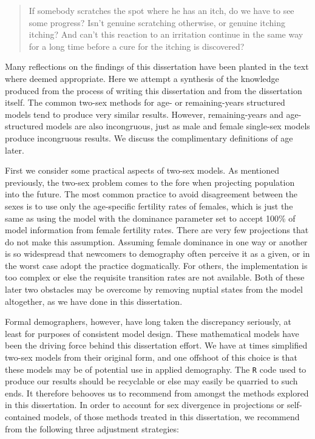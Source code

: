 \FloatBarrier
\label{sec:reflections}


\begin{singlespace}
\begin{quote}
 If somebody scratches the spot where he has an itch, do we have to see 
 some progress? Isn't genuine scratching otherwise, or genuine itching 
itching? And can't this reaction to an irritation continue in the 
same way for a long time before a cure for the itching is discovered?
\citep{wittgenstein1984culture}
\end{quote}
\end{singlespace}

Many reflections on the findings of this dissertation have been planted in the
text where deemed appropriate. Here we attempt a synthesis of the
knowledge produced from the process of writing this dissertation and from the
dissertation itself. The common two-sex methods for age- or remaining-years
structured models tend to produce very similar results. However, remaining-years
and age-structured models are also incongruous, just as male and female
single-sex models produce incongruous results. We discuss the complimentary definitions 
of age later. 

First we consider some practical aspects of two-sex models. As mentioned
previously, the two-sex problem comes to the fore when projecting population into the
future. The most common practice to avoid disagreement between the sexes is to
use only the age-specific fertility rates of females, which is just the same as
using the \citet{goodman1967age} model with the dominance parameter set to
accept 100\% of model information from female fertility rates. There are
very few projections that do not make this assumption. Assuming female dominance
in one way or another is so widespread that newcomers to demography often perceive 
it as a given, or in the worst case adopt the
practice dogmatically. For others, the implementation is too complex or
else the requisite transition rates are not available. Both of these later
two obstacles may be overcome by removing nuptial states from the model
altogether, as we have done in this dissertation. 

Formal demographers, however, have long taken the discrepancy seriously, at
least for purposes of consistent model design. These mathematical models
have been the driving force behind this dissertation effort. We have at
times simplified two-sex models from their original form, and one offshoot of
this choice is that these models may be of potential use in applied demography.
The \texttt{R} code used to produce our results should be recyclable or else may
easily be quarried to such ends. It therefore behooves us to recommend from
amongst the methods explored in this dissertation. In order to account for sex
divergence in projections or self-contained models, of those methods treated in this dissertation, 
we recommend from the following three adjustment strategies:

